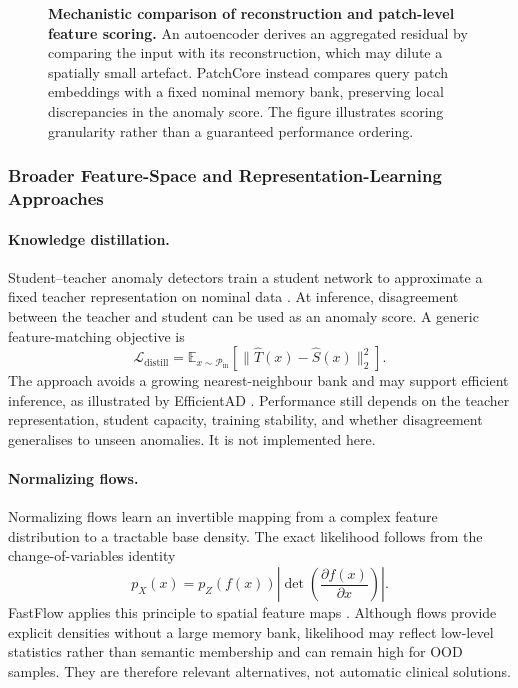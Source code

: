 \documentclass[fleqn,12pt]{olplainarticle}
\begin{document}
\begin{figure}[htbp]
{\begin{tikzpicture}
\end{tikzpicture}%
}

\caption[Reconstruction versus patch-level anomaly scoring.]{\textbf{Mechanistic
comparison of reconstruction and patch-level feature scoring.}
An autoencoder derives an aggregated residual by comparing the input with its reconstruction, which may dilute a spatially small artefact. PatchCore instead compares query patch embeddings with a fixed nominal memory bank, preserving local discrepancies in the anomaly score. The figure illustrates scoring granularity rather than a guaranteed performance ordering.}
\label{fig:architecture_comparison}
\end{figure}

\subsubsection{Broader Feature-Space and Representation-Learning Approaches}

\paragraph{Knowledge distillation.}
Student--teacher anomaly detectors train a student network to approximate a fixed teacher representation on nominal data \cite{salehi2021multiresolution}. At inference, disagreement between the teacher and student can be used as an anomaly score. A generic feature-matching objective is
\begin{equation}
    \mathcal{L}_{\mathrm{distill}}=
    \mathbb{E}_{x\sim\mathcal{P}_{\mathrm{in}}}
    \left[\lVert \widehat{T}(x)-\widehat{S}(x)\rVert_2^2\right].
\end{equation}
The approach avoids a growing nearest-neighbour bank and may support efficient inference, as illustrated by EfficientAD \cite{batzner2024efficientad}. Performance still depends on the teacher representation, student capacity, training stability, and whether disagreement generalises to unseen anomalies. It is not implemented here.

\paragraph{Normalizing flows.}
Normalizing flows learn an invertible mapping from a complex feature distribution to a tractable base density. The exact likelihood follows from the change-of-variables identity
\begin{equation}
    p_X(x)=p_Z(f(x))
    \left|\det\left(\frac{\partial f(x)}{\partial x}\right)\right|.
\end{equation}
FastFlow applies this principle to spatial feature maps \cite{yu2021fastflow}. Although flows provide explicit densities without a large memory bank, likelihood may reflect low-level statistics rather than semantic membership and can remain high for OOD samples. They are therefore relevant alternatives, not automatic clinical solutions.
\end{document}
